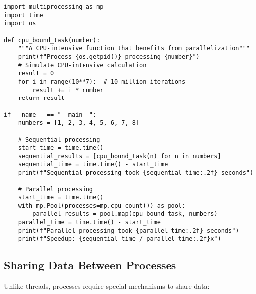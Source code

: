 \documentclass[12pt,letterpaper]{article}
\newenvironment{macterminal}{%
    \begin{mdframed}[
        linecolor=terminalFrame,
        backgroundcolor=terminalBg,
        roundcorner=5pt,
        skipabove=10pt,
        skipbelow=10pt,
        linewidth=1pt,
        innertopmargin=10pt, %
        frametitle={%
            \tikz[baseline=(current bounding box.east), outer sep=0pt]{
                \fill[red!80!black] (0,0) circle (5pt);
                \fill[yellow!80!black] (0.7,0) circle (5pt);
                \fill[green!70!black] (1.4,0) circle (5pt);
            }
        },
        frametitlealignment=\raggedright, %
        frametitleaboveskip=8pt, %
        frametitlebelowskip=0pt, %
    ]
}{%
    \end{mdframed}%
}
\begin{document}
\begin{macterminal}
\begin{lstlisting}
import multiprocessing as mp
import time
import os

def cpu_bound_task(number):
    """A CPU-intensive function that benefits from parallelization"""
    print(f"Process {os.getpid()} processing {number}")
    # Simulate CPU-intensive calculation
    result = 0
    for i in range(10**7):  # 10 million iterations
        result += i * number
    return result

if __name__ == "__main__":
    numbers = [1, 2, 3, 4, 5, 6, 7, 8]
    
    # Sequential processing
    start_time = time.time()
    sequential_results = [cpu_bound_task(n) for n in numbers]
    sequential_time = time.time() - start_time
    print(f"Sequential processing took {sequential_time:.2f} seconds")
    
    # Parallel processing
    start_time = time.time()
    with mp.Pool(processes=mp.cpu_count()) as pool:
        parallel_results = pool.map(cpu_bound_task, numbers)
    parallel_time = time.time() - start_time
    print(f"Parallel processing took {parallel_time:.2f} seconds")
    print(f"Speedup: {sequential_time / parallel_time:.2f}x")
\end{lstlisting}
\end{macterminal}

\subsection{Sharing Data Between Processes}

Unlike threads, processes require special mechanisms to share data:
\end{document}
